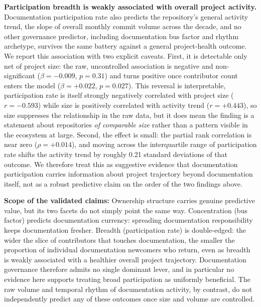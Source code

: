 \documentclass[10pt,conference]{IEEEtran}
\begin{document}
{{\textbf{Participation breadth is weakly associated with overall project activity.} Documentation participation rate also predicts the repository's general activity trend, the slope of overall monthly commit volume across the decade, and no other governance predictor, including documentation bus factor and rhythm archetype, survives the same battery against a general project-health outcome. We report this association with two explicit caveats. First, it is detectable only net of project size: the raw, uncontrolled association is negative and non-significant ($\beta = -0.009$, $p = 0.31$) and turns positive once contributor count enters the model ($\beta = +0.022$, $p = 0.027$). This reversal is interpretable, participation rate is itself strongly negatively correlated with project size ($r = -0.593$) while size is positively correlated with activity trend ($r = +0.443$), so size suppresses the relationship in the raw data, but it does mean the finding is a statement about repositories \textit{of comparable size} rather than a pattern visible in the ecosystem at large. Second, the effect is small: the partial rank correlation is near zero ($\rho = +0.014$), and moving across the interquartile range of participation rate shifts the activity trend by roughly 0.21 standard deviations of that outcome. We therefore treat this as suggestive evidence that documentation participation carries information about project trajectory beyond documentation itself, not as a robust predictive claim on the order of the two findings above.

\textbf{Scope of the validated claims:} Ownership structure carries genuine predictive value, but its two facets do not simply point the same way. Concentration (bus factor) predicts documentation currency: spreading documentation responsibility keeps documentation fresher. Breadth (participation rate) is double-edged: the wider the slice of contributors that touches documentation, the smaller the proportion of individual documentation newcomers who return, even as breadth is weakly associated with a healthier overall project trajectory. Documentation governance therefore admits no single dominant lever, and in particular no evidence here supports treating broad participation as uniformly beneficial. The raw volume and temporal rhythm of documentation activity, by contrast, do not independently predict any of these outcomes once size and volume are controlled.


}}
\end{document}
